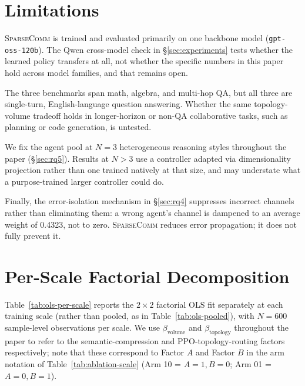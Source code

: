 \documentclass[11pt]{article}
\newcommand{\sys}{\textsc{SparseComm}\xspace}
\begin{document}
\section{Limitations}
\label{sec:limitations}

\sys is trained and evaluated primarily on one backbone model
(\texttt{gpt-oss-120b}). The Qwen cross-model check in
\S\ref{sec:experiments} tests whether the learned policy transfers at all,
not whether the specific numbers in this paper hold across model families,
and that remains open.

The three benchmarks span math, algebra, and multi-hop QA, but all three
are single-turn, English-language question answering. Whether the same
topology-volume tradeoff holds in longer-horizon or non-QA collaborative
tasks, such as planning or code generation, is untested.

We fix the agent pool at $N=3$ heterogeneous reasoning styles throughout
the paper (\S\ref{sec:rq5}). Results at $N>3$ use a controller adapted via
dimensionality projection rather than one trained natively at that size,
and may understate what a purpose-trained larger controller could do.


Finally, the error-isolation mechanism in \S\ref{sec:rq4} suppresses
incorrect channels rather than eliminating them: a wrong agent's channel is
dampened to an average weight of 0.4323, not to zero. \sys reduces error
propagation; it does not fully prevent it.






\clearpage
\appendix

\section{Per-Scale Factorial Decomposition}
\label{app:per-scale-ols}

Table~\ref{tab:ols-per-scale} reports the $2\times2$ factorial OLS fit
separately at each training scale (rather than pooled, as in
Table~\ref{tab:ols-pooled}), with $N=600$ sample-level observations per
scale. We use $\beta_{\text{volume}}$ and $\beta_{\text{topology}}$
throughout the paper to refer to the semantic-compression and
PPO-topology-routing factors respectively; note that these correspond to
Factor $A$ and Factor $B$ in the arm notation of
Table~\ref{tab:ablation-scale} (Arm 10 = $A{=}1,B{=}0$; Arm 01 =
$A{=}0,B{=}1$).
\end{document}
